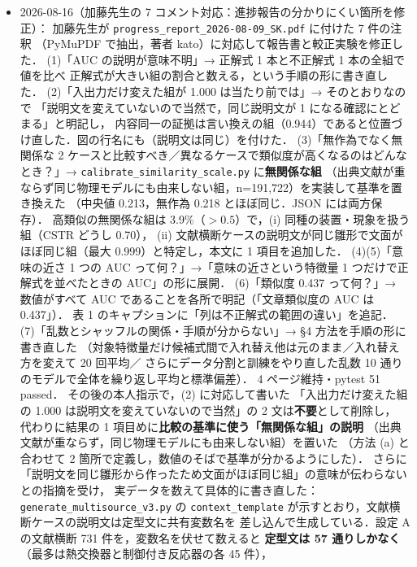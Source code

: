 \documentclass[11pt,a4paper]{jsarticle}
\begin{document}
\begin{itemize}[nosep]
  \item 2026-08-16（加藤先生の 7 コメント対応：進捗報告の分かりにくい箇所を修正）：
    加藤先生が \texttt{progress\_report\_2026-08-09\_SK.pdf} に付けた 7 件の注釈
    （PyMuPDF で抽出，著者 kato）に対応して報告書と較正実験を修正した．
    (1)「AUC の説明が意味不明」→ 正解式 1 本と不正解式 1 本の全組で値を比べ
    正解式が大きい組の割合と数える，という手順の形に書き直した．
    (2)「入出力だけ変えた組が 1.000 は当たり前では」→ そのとおりなので
    「説明文を変えていないので当然で，同じ説明文が 1 になる確認にとどまる」と明記し，
    内容同一の証拠は言い換えの組（0.944）であると位置づけ直した．図の行名にも（説明文は同じ）を付けた．
    (3)「無作為でなく無関係な 2 ケースと比較すべき／異なるケースで類似度が高くなるのはどんなとき？」→
    \texttt{calibrate\_similarity\_scale.py} に\textbf{無関係な組}
    （出典文献が重ならず同じ物理モデルにも由来しない組，n=191,722）を実装して基準を置き換えた
    （中央値 0.213，無作為 0.218 とほぼ同じ．JSON には両方保存）．
    高類似の無関係な組は 3.9\%（$>0.5$）で，(i) 同種の装置・現象を扱う組（CSTR どうし 0.70），
    (ii) 文献横断ケースの説明文が同じ雛形で文面がほぼ同じ組（最大 0.999）と特定し，本文に 1 項目を追加した．
    (4)(5)「意味の近さ 1 つの AUC って何？」→「意味の近さという特徴量 1 つだけで正解式を並べたときの AUC」の形に展開．
    (6)「類似度 0.437 って何？」→ 数値がすべて AUC であることを各所で明記（「文章類似度の AUC は 0.437」）．
    表 1 のキャプションに「列は不正解式の範囲の違い」を追記．
    (7)「乱数とシャッフルの関係・手順が分からない」→ \S 4 方法を手順の形に書き直した
    （対象特徴量だけ候補式間で入れ替え他は元のまま／入れ替え方を変えて 20 回平均／
    さらにデータ分割と訓練をやり直した乱数 10 通りのモデルで全体を繰り返し平均と標準偏差）．
    4 ページ維持・pytest 51 passed．
    その後の本人指示で，(2) に対応して書いた
    「入出力だけ変えた組の 1.000 は説明文を変えていないので当然」の 2 文は\textbf{不要}として削除し，
    代わりに結果の 1 項目めに\textbf{比較の基準に使う「無関係な組」の説明}
    （出典文献が重ならず，同じ物理モデルにも由来しない組）を置いた
    （方法 (a) と合わせて 2 箇所で定義し，数値のそばで基準が分かるようにした）．
    さらに「説明文を同じ雛形から作ったため文面がほぼ同じ組」の意味が伝わらないとの指摘を受け，
    実データを数えて具体的に書き直した：\texttt{generate\_multisource\_v3.py} の
    \texttt{context\_template} が示すとおり，文献横断ケースの説明文は定型文に共有変数名を
    差し込んで生成している．設定 A の文献横断 731 件を，変数名を伏せて数えると
    \textbf{定型文は 57 通りしかなく}（最多は熱交換器と制御付き反応器の各 45 件），

\end{itemize}
\end{document}
